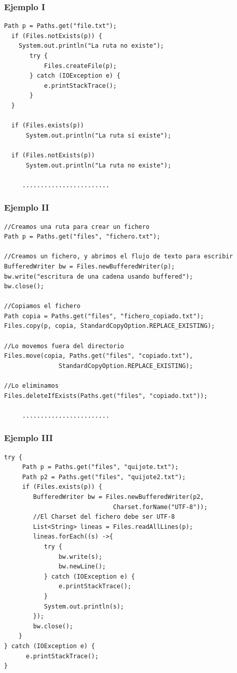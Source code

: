 \documentclass{beamer}
\begin{document}
\begin{frame}[fragile]
\frametitle{Ejemplo I}
\begin{verbatim}
Path p = Paths.get("file.txt");
  if (Files.notExists(p)) {
    System.out.println("La ruta no existe");
       try {
           Files.createFile(p);
       } catch (IOException e) {
           e.printStackTrace();
       }
  }

  if (Files.exists(p))
      System.out.println("La ruta sí existe");

  if (Files.notExists(p))
      System.out.println("La ruta no existe");

     ........................
\end{verbatim}
\end{frame}

\begin{frame}[fragile]
\frametitle{Ejemplo II}
\begin{small}
\begin{verbatim}
//Creamos una ruta para crear un fichero
Path p = Paths.get("files", "fichero.txt");

//Creamos un fichero, y abrimos el flujo de texto para escribir
BufferedWriter bw = Files.newBufferedWriter(p);
bw.write("escritura de una cadena usando buffered");
bw.close();

//Copiamos el fichero
Path copia = Paths.get("files", "fichero_copiado.txt");
Files.copy(p, copia, StandardCopyOption.REPLACE_EXISTING);

//Lo movemos fuera del directorio
Files.move(copia, Paths.get("files", "copiado.txt"),
               StandardCopyOption.REPLACE_EXISTING);

//Lo eliminamos
Files.deleteIfExists(Paths.get("files", "copiado.txt"));

     ........................
\end{verbatim}
\end{small}
\end{frame}


\begin{frame}[fragile]
\frametitle{Ejemplo III}
\begin{footnotesize}

\begin{verbatim}
try {
     Path p = Paths.get("files", "quijote.txt");
     Path p2 = Paths.get("files", "quijote2.txt");
     if (Files.exists(p)) {
        BufferedWriter bw = Files.newBufferedWriter(p2,
                              Charset.forName("UTF-8"));
        //El Charset del fichero debe ser UTF-8
        List<String> lineas = Files.readAllLines(p);
        lineas.forEach((s) ->{
           try {
               bw.write(s);
               bw.newLine();
           } catch (IOException e) {
               e.printStackTrace();
           }
           System.out.println(s);
        });
        bw.close();
    }
} catch (IOException e) {
      e.printStackTrace();
}
\end{verbatim}

\end{footnotesize}
\end{frame}
\end{document}
